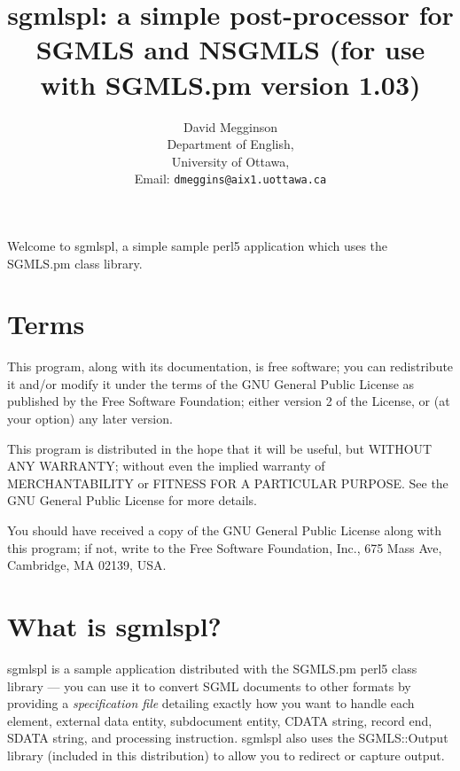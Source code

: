 
\setlength{\parskip}{3ex}
\raggedright

\title{sgmlspl: a simple post-processor for SGMLS and NSGMLS (for use
with {\sc SGMLS.pm} version 1.03)}
\author{David Megginson \\
  Department of English, \\
  University of Ottawa, \\
  Email: {\tt dmeggins@aix1.uottawa.ca} \\
}



\maketitle


Welcome to {\sc sgmlspl}, a simple sample {\sc perl5} application which
uses the {\sc SGMLS.pm} class library.


{\em\section{Terms}
\label{TERMS}


This program, along with its documentation, is free software;
you can redistribute it and/or modify it under the terms of the GNU
General Public License as published by the Free Software Foundation;
either version 2 of the License, or (at your option) any later
version.

This program is distributed in the hope that it will be useful,
but WITHOUT ANY WARRANTY; without even the implied warranty of
MERCHANTABILITY or FITNESS FOR A PARTICULAR PURPOSE.  See the GNU
General Public License for more details.

You should have received a copy of the GNU General Public
License along with this program; if not, write to the Free Software
Foundation, Inc., 675 Mass Ave, Cambridge, MA 02139, USA.


}



\section{What is {\sc sgmlspl}?}
\label{DEFINITION}


{\sc sgmlspl} is a sample application distributed with the
{\sc SGMLS.pm} {\sc perl5} class library {---} you can use it to convert
{\sc SGML} documents to other formats by providing a {\em specification file\/}
detailing exactly how you want to handle each element, external data
entity, subdocument entity, CDATA string, record end, SDATA string,
and processing instruction.  {\sc sgmlspl} also uses the {\sc SGMLS::Output}
library (included in this distribution) to allow you to redirect or
capture output.

